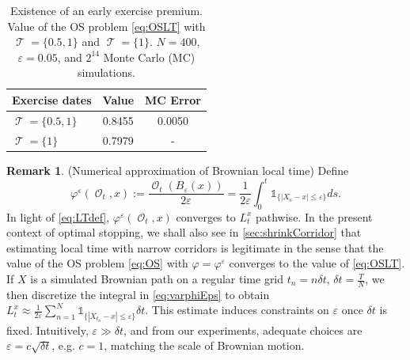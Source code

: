 \documentclass[11pt]{article}
\theoremstyle{plain}
\theoremstyle{definition}
\newtheorem{remark}{Remark}
\DeclareMathOperator{\calO}{\mathcal{O}}
\DeclareMathOperator{\calT}{\mathcal{T}}
\begin{document}
\begin{table}[H]
    \centering
        \caption{Existence of an early exercise premium. Value of the OS problem \eqref{eq:OSLT} with $\calT = \{0.5,1\}$ and %
        $\calT = \{1\}$.    $N=400$,  $\varepsilon  = 0.05$, and $2^{14}$ Monte Carlo (MC) simulations. }
    \begin{tabular}{lcc}
      Exercise dates  &  Value & MC Error\\ \hline\hline
    $\calT = \{0.5,1\}$  & 0.8455 & 0.0050\\
     $\calT = \{1\}$  & 0.7979 & -   
    \end{tabular}
\label{tab:earlyPremiumBermud2}
\end{table}


\begin{remark}\label{rem:locTimeNum}
    \textnormal{(Numerical approximation of Brownian local time)}  Define %
\begin{equation}\label{eq:varphiEps}
     \varphi^{\varepsilon}(\calO_t,x) := \frac{\calO_t(B_{\varepsilon}(x))}{2\varepsilon}  = \frac{1}{2\varepsilon}\int_0^t \mathds{1}_{\{|X_s-x| \le \varepsilon\}}ds.
 \end{equation}
 In light of \eqref{eq:LTdef}, $\varphi^{\varepsilon}(\calO_t,x)$  converges to $ L_{t}^{x}$ pathwise. In the present context of optimal stopping, we shall also see  in \cref{sec:shrinkCorridor} that  %
 estimating local time with
 narrow corridors  is legitimate in the sense that the value of the OS problem  \eqref{eq:OS} with $\varphi = \varphi^{\varepsilon}$  converges to the value of \eqref{eq:OSLT}. 
 If $X$ is a simulated Brownian path on a regular time grid $t_n = n\delta t$, $\delta t = \frac{T}{N}$,  we then discretize the  integral in \eqref{eq:varphiEps} to obtain
    $L_t^x \approx \frac{1}{2\varepsilon}\sum_{n=1}^N \mathds{1}_{\{|X_{t_n}-x| \le \varepsilon\}}\delta t. $
This estimate  induces   constraints on  $\varepsilon$ once $\delta t$ is fixed. 
  Intuitively, $\varepsilon \gg \delta t $,  and from our experiments, adequate choices are  
 $\varepsilon = c\sqrt{\delta t}$, e.g. $c = 1$, matching the scale of Brownian motion. 
\end{remark}
\end{document}
